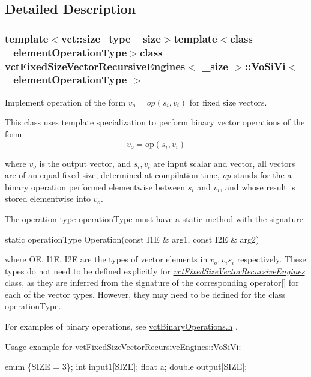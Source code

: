 \subsection{Detailed Description}
\subsubsection*{template$<$vct\+::size\+\_\+type \+\_\+size$>$template$<$class \+\_\+element\+Operation\+Type$>$class vct\+Fixed\+Size\+Vector\+Recursive\+Engines$<$ \+\_\+size $>$\+::\+Vo\+Si\+Vi$<$ \+\_\+element\+Operation\+Type $>$}

Implement operation of the form $v_o = op(s_i, v_i)$ for fixed size vectors. 

This class uses template specialization to perform binary vector operations of the form \[ v_o = \mathrm{op}(s_i, v_i) \]

where $v_o$ is the output vector, and $s_i, v_i$ are input scalar and vector, all vectors are of an equal fixed size, determined at compilation time, {\itshape op} stands for the a binary operation performed elementwise between $s_i$ and $v_i$, and whose result is stored elementwise into $v_o$.

The operation type operation\+Type must have a static method with the signature


\begin{DoxyPre}
static operationType Operation(const I1E & arg1, const I2E & arg2)
\end{DoxyPre}


where O\+E, I1\+E, I2\+E are the types of vector elements in $v_o, v_i s_i$ respectively. These types do not need to be defined explicitly for {\itshape \hyperlink{classvct_fixed_size_vector_recursive_engines}{vct\+Fixed\+Size\+Vector\+Recursive\+Engines}} class, as they are inferred from the signature of the corresponding operator\mbox{[}\mbox{]} for each of the vector types. However, they may need to be defined for the class operation\+Type.

For examples of binary operations, see \hyperlink{vct_binary_operations_8h}{vct\+Binary\+Operations.\+h} .

Usage example for \hyperlink{classvct_fixed_size_vector_recursive_engines_1_1_vo_si_vi}{vct\+Fixed\+Size\+Vector\+Recursive\+Engines\+::\+Vo\+Si\+Vi}\+: 
\begin{DoxyPre}
enum \{SIZE = 3\};
int input1[SIZE];
float a;
double output[SIZE];\end{DoxyPre}



